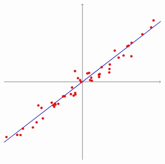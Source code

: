 \begin{equation*}
  \begin{tikzpicture}
    \draw[thin,->] (-4,0) -- (4,0);
    \draw[thin,->] (0,-4) -- (0,4);
    \draw[thick,blue] (-4,-4/1.29) -- (4,4/1.29);
    \fill[color=red] (-2.25,-1.21) circle (0.06);
    \fill[color=red] (-1.44,-1.28) circle (0.06);
    \fill[color=red] (2.29,1.82) circle (0.06);
    \fill[color=red] (0.25,0.43) circle (0.06);
    \fill[color=red] (-1.57,-1.07) circle (0.06);
    \fill[color=red] (2.51,2.00) circle (0.06);
    \fill[color=red] (-2.53,-2.34) circle (0.06);
    \fill[color=red] (-3.04,-2.40) circle (0.06);
    \fill[color=red] (0.84,0.36) circle (0.06);
    \fill[color=red] (-3.16,-2.73) circle (0.06);
    \fill[color=red] (-2.02,-1.88) circle (0.06);
    \fill[color=red] (3.06,2.44) circle (0.06);
    \fill[color=red] (-1.40,-1.12) circle (0.06);
    \fill[color=red] (-2.09,-1.34) circle (0.06);
    \fill[color=red] (-1.23,-1.13) circle (0.06);
    \fill[color=red] (0.48,0.06) circle (0.06);
    \fill[color=red] (-1.49,-1.20) circle (0.06);
    \fill[color=red] (0.98,0.75) circle (0.06);
    \fill[color=red] (1.40,0.89) circle (0.06);
    \fill[color=red] (-0.12,0.09) circle (0.06);
    \fill[color=red] (0.88,0.40) circle (0.06);
    \fill[color=red] (-0.38,0.55) circle (0.06);
    \fill[color=red] (0.34,0.46) circle (0.06);
    \fill[color=red] (0.45,0.21) circle (0.06);
    \fill[color=red] (-0.59,-0.63) circle (0.06);
    \fill[color=red] (-0.53,-0.29) circle (0.06);
    \fill[color=red] (2.10,1.35) circle (0.06);
    \fill[color=red] (1.65,1.60) circle (0.06);
    \fill[color=red] (-3.88,-2.83) circle (0.06);
    \fill[color=red] (-0.07,-0.01) circle (0.06);
    \fill[color=red] (-0.37,-0.57) circle (0.06);
    \fill[color=red] (-0.99,-0.75) circle (0.06);
    \fill[color=red] (-2.34,-2.08) circle (0.06);
    \fill[color=red] (3.63,3.15) circle (0.06);
    \fill[color=red] (1.37,0.48) circle (0.06);
    \fill[color=red] (-0.96,-0.74) circle (0.06);
    \fill[color=red] (3.51,2.79) circle (0.06);
    \fill[color=red] (-3.33,-2.72) circle (0.06);
    \fill[color=red] (0.39,0.09) circle (0.06);
    \fill[color=red] (-1.38,-1.17) circle (0.06);
    \fill[color=red] (-0.36,-0.65) circle (0.06);
    \fill[color=red] (1.38,0.66) circle (0.06);
    \fill[color=red] (1.85,1.24) circle (0.06);
    \fill[color=red] (2.35,1.85) circle (0.06);
    \fill[color=red] (0.85,0.25) circle (0.06);
    \fill[color=red] (-0.23,0.19) circle (0.06);
    \fill[color=red] (-0.90,-0.74) circle (0.06);
    \fill[color=red] (2.50,1.31) circle (0.06);
    \fill[color=red] (-0.45,-0.71) circle (0.06);

\end{tikzpicture}
\end{equation*}
